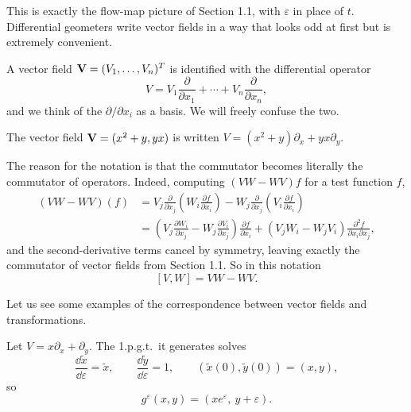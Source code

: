 \documentclass[a4paper]{scrartcl}
\begin{document}
This is exactly the flow-map picture of Section 1.1, with $\varepsilon$ in place of $t$. Differential geometers write vector fields in a way that looks odd at first but is extremely convenient.

\begin{notation}
	A vector field $\mathbf{V} = (V_1,\dots,V_n)^T$ is identified with the differential operator
	$$
	V = V_1\frac{\partial}{\partial x_1} + \cdots + V_n\frac{\partial}{\partial x_n},
	$$
	and we think of the $\partial/\partial x_i$ as a basis. We will freely confuse the two.
\end{notation}

\begin{example}
	The vector field $\mathbf{V} = (x^2+y, yx)$ is written $V = (x^2+y)\partial_x + yx\partial_y$.
\end{example}

The reason for the notation is that the commutator becomes literally the commutator of operators. Indeed, computing $(VW - WV)f$ for a test function $f$,
\begin{align*}
	(VW-WV)(f) &= V_j\frac{\partial}{\partial x_j}\left(W_i\frac{\partial f}{\partial x_i}\right) - W_j\frac{\partial}{\partial x_j}\left(V_i\frac{\partial f}{\partial x_i}\right)\\
	&= \left(V_j\frac{\partial W_i}{\partial x_j} - W_j\frac{\partial V_i}{\partial x_j}\right)\frac{\partial f}{\partial x_i} + \left(V_jW_i - W_jV_i\right)\frac{\partial^2f}{\partial x_i\partial x_j},
\end{align*}
and the second-derivative terms cancel by symmetry, leaving exactly the commutator of vector fields from Section 1.1. So in this notation
$$
[V,W] = VW - WV.
$$

Let us see some examples of the correspondence between vector fields and transformations.

\begin{example}
	Let $V = x\partial_x + \partial_y$. The 1.p.g.t.\ it generates solves
	$$
	\frac{\dd\tilde x}{\dd\varepsilon} = \tilde x, \qquad \frac{\dd\tilde y}{\dd\varepsilon} = 1, \qquad (\tilde x(0),\tilde y(0)) = (x,y),
	$$
	so
	$$
	g^\varepsilon(x,y) = \left(xe^\varepsilon,\ y+\varepsilon\right).
	$$
\end{example}
\end{document}

